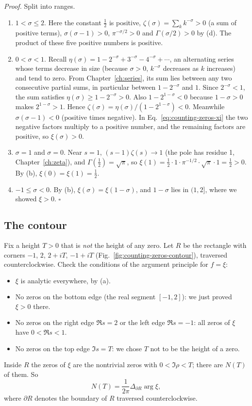 \emph{Proof.} Split into ranges.
\begin{enumerate}
\item $1<\sigma\le2$. Here the constant $\tfrac12$ is positive, $\zeta(\sigma)=\sum_k k^{-\sigma}>0$ (a sum of positive terms), $\sigma(\sigma-1)>0$, $\pi^{-\sigma/2}>0$ and $\Gamma(\sigma/2)>0$ by (d). The product of these five positive numbers is positive.
\item $0<\sigma<1$. Recall $\eta(\sigma)=1-2^{-\sigma}+3^{-\sigma}-4^{-\sigma}+\cdots$, an alternating series whose terms decrease in size (because $\sigma>0$, $k^{-\sigma}$ decreases as $k$ increases) and tend to zero. From Chapter~\ref{ch:series}, its sum lies between any two consecutive partial sums, in particular between $1-2^{-\sigma}$ and $1$. Since $2^{-\sigma}<1$, the sum satisfies $\eta(\sigma)\ge1-2^{-\sigma}>0$. Also $1-2^{1-\sigma}<0$ because $1-\sigma>0$ makes $2^{1-\sigma}>1$. Hence $\zeta(\sigma)=\eta(\sigma)/(1-2^{1-\sigma})<0$. Meanwhile $\sigma(\sigma-1)<0$ (positive times negative). In Eq.~\eqref{eq:counting-zeros-xi} the two negative factors multiply to a positive number, and the remaining factors are positive, so $\xi(\sigma)>0$.
\item $\sigma=1$ and $\sigma=0$. Near $s=1$, $(s-1)\zeta(s)\to1$ (the pole has residue 1, Chapter~\ref{ch:zeta}), and $\Gamma(\tfrac12)=\sqrt\pi$, so $\xi(1)=\tfrac12\cdot1\cdot\pi^{-1/2}\cdot\sqrt\pi\cdot1=\tfrac12>0$. By (b), $\xi(0)=\xi(1)=\tfrac12$.
\item $-1\le\sigma<0$. By (b), $\xi(\sigma)=\xi(1-\sigma)$, and $1-\sigma$ lies in $(1,2]$, where we showed $\xi>0$. $\square$
\end{enumerate}

\subsection{The contour}

Fix a height $T>0$ that is \emph{not} the height of any zero. Let $R$ be the rectangle with corners $-1$, $2$, $2+iT$, $-1+iT$ (Fig.~\ref{fig:counting-zeros-contour}), traversed counterclockwise. Check the conditions of the argument principle for $f=\xi$:
\begin{itemize}
\item $\xi$ is analytic everywhere, by (a).
\item No zeros on the bottom edge (the real segment $[-1,2]$): we just proved $\xi>0$ there.
\item No zeros on the right edge $\Re s=2$ or the left edge $\Re s=-1$: all zeros of $\xi$ have $0<\Re s<1$.
\item No zeros on the top edge $\Im s=T$: we chose $T$ not to be the height of a zero.
\end{itemize}
Inside $R$ the zeros of $\xi$ are the nontrivial zeros with $0<\Im\rho<T$; there are $N(T)$ of them. So
\begin{equation}
N(T)=\frac{1}{2\pi}\Delta_{\partial R}\arg\xi,
\label{eq:counting-zeros-NR}
\end{equation}
where $\partial R$ denotes the boundary of $R$ traversed counterclockwise.

